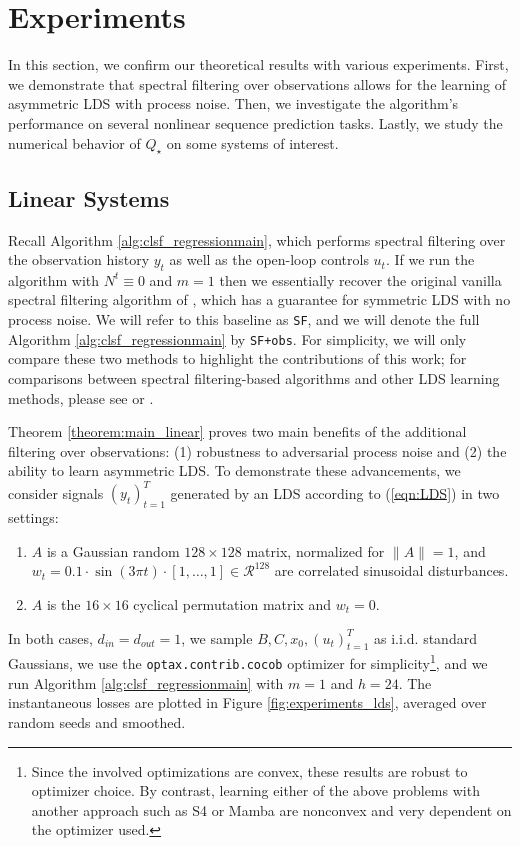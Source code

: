 \documentclass[11pt]{article}
\def\R{{\mathcal R}}
\def\R{\ensuremath{\mathcal R}}
\numberwithin{equation}{section}
\begin{document}
\section{Experiments}\label{sec:experiments}

In this section, we confirm our theoretical results with various experiments. First, we demonstrate that spectral filtering over observations allows for the learning of asymmetric LDS with process noise. Then, we investigate the algorithm's performance on several nonlinear sequence prediction tasks. Lastly, we study the numerical behavior of $Q_\star$ on some systems of interest.

\subsection{Linear Systems}


Recall Algorithm \ref{alg:clsf_regressionmain}, which performs spectral filtering over the observation history $y_t$ as well as the open-loop controls $u_t$. If we run the algorithm with $N^t \equiv 0$ and $m=1$ then we essentially recover the original vanilla spectral filtering algorithm of \cite{hazan2017learning}, which has a guarantee for symmetric LDS with no process noise. We will refer to this baseline as \verb|SF|, and we will denote the full Algorithm \ref{alg:clsf_regressionmain} by \verb|SF+obs|. For simplicity, we will only compare these two methods to highlight the contributions of this work; for comparisons between spectral filtering-based algorithms and other LDS learning methods, please see \cite{liu2024flash} or \cite{shah2025spectraldsprovabledistillationlinear}. 

Theorem \ref{theorem:main_linear} proves two main benefits of the additional filtering over observations: (1) robustness to adversarial process noise and (2) the ability to learn asymmetric LDS. To demonstrate these advancements, we consider signals $(y_t)_{t=1}^T$ generated by an LDS according to (\ref{eqn:LDS}) in two settings:
\begin{enumerate}
    \item[(1)]$A$ is a Gaussian random $128 \times 128$
    matrix, normalized for $\|A\| = 1$, and $w_t = 0.1 \cdot \sin(3\pi t) \cdot [1,\ldots, 1] \in \R^{128}$ are correlated sinusoidal disturbances.
    \item[(2)] $A$ is the $16 \times 16$ cyclical permutation matrix and $w_t = 0$.
\end{enumerate}
In both cases, $d_{in}=d_{out}=1$, we sample $B, C, x_0, (u_t)_{t=1}^T$ as i.i.d. standard Gaussians, we use the \verb|optax.contrib.cocob| optimizer for simplicity\footnote{Since the involved optimizations are convex, these results are robust to optimizer choice. By contrast, learning either of the above problems with another approach such as S4 or Mamba are nonconvex and very dependent on the optimizer used.}, and we run Algorithm \ref{alg:clsf_regressionmain} with $m = 1$ and $h=24$. The instantaneous losses are plotted in Figure \ref{fig:experiments_lds}, averaged over random seeds and smoothed.
\end{document}
